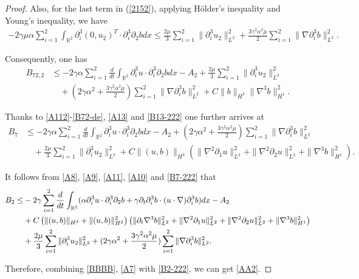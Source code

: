 \documentclass[reqno,11pt]{amsart}
\def\R{\mathbb R}
\numberwithin{Thm}{section}
\begin{document}
\begin{proof}
Also, for the last term in (\ref{2152}), applying H\"{o}lder's inequality and Young's inequality, we have
 \begin{align*}
-2\gamma\mu\alpha\sum_{i=1}^2\int_{\R^2}\partial_i^3 (0,u_2)^{T}\cdot\partial_i^3\partial_2 bdx
\leq \frac{2\mu}{3}\sum_{i=1}^2\| \partial_i^3u_2\|_{L^2}^2+\frac{3\gamma^2\alpha^2\mu}{2}\sum_{i=1}^2\|\nabla \partial_i^3b\|_{L^2}^2.
\end{align*}

Consequently, one has
\begin{align}\label{B13-222}
B_{72,2}
&\leq-2\gamma\alpha\sum_{i=1}^2\frac{d}{dt}\int_{\R^2}\partial_i^3u\cdot\partial_i^3 \partial_2bdx-A_2+ \frac{2\mu}{3}\sum_{i=1}^2\| \partial_i^3u_2\|_{L^2}^2\nonumber\\
&\quad+(2\gamma\alpha^2+\frac{3\gamma^2\alpha^2\mu}{2})\sum_{i=1}^2\|\nabla \partial_i^3b\|_{L^2}^2+C\|b\|_{H^{3}}\|\nabla^3 b\|_{H^1}^2.
\end{align}






Thanks to \eqref{A112}-\eqref{B72-de}, \eqref{A13} and \eqref{B13-222} one further arrives at
\begin{align}\label{B7-222}
B_{7}
&\leq-2\gamma\alpha\sum_{i=1}^2\frac{d}{dt}\int_{\R^2}\partial_i^3u\cdot\partial_i^3 \partial_2bdx-A_2+(2\gamma\alpha^2+\frac{3\gamma^2\alpha^2\mu}{2})\sum_{i=1}^2\|\nabla\partial_i^3 b\|_{L^2}^2\nonumber\\
&\quad+ \frac{2\mu}{3}\sum_{i=1}^2\| \partial_i^3u_2\|_{L^2}^2+C\| (u,b)\|_{H^{3}}(\|\nabla^2\partial_1u\|_{L^2}^2+\|\nabla^2\partial_2u\|_{L^2}^2+\|\nabla^3 b\|_{H^1}^2).
\end{align}



It follows from \eqref{A8}, \eqref{A9}, \eqref{A11}, \eqref{A10} and \eqref{B7-222}  that
\begin{align}\label{B2-222}
B_2
\leq&
-2\gamma\sum_{i=1}^2\frac{d}{dt}\int_{\R^2}(\alpha\partial_i^3u\cdot\partial_i^3\partial_2b+\gamma\partial_{t}\partial_i^3b\cdot (u\cdot\nabla)\partial_i^3 b)dx-{A_{2}}\notag\\
&+C\left(\|(u,b)\|_{H^{3}}+\|(u,b)\|_{H^{3}}^2\right)\left(\|\partial_t\nabla^3b\|_{L^2}^2+\|\nabla^2\partial_1u\|_{L^2}^2+\|\nabla^2\partial_2u\|_{L^2}^2+\|\nabla^3 b\|_{H^1}^2\right)\notag\\
&+\frac{2\mu}{3}\sum_{i=1}^2\| \partial_i^3u_2\|_{L^2}^2+(2\gamma\alpha^2+\frac{3\gamma^2\alpha^2\mu}{2})\sum_{i=1}^2\|\nabla\partial_i^3 b\|_{L^2}^2.
\end{align}




Therefore, combining \eqref{BBBB}, \eqref{A7} with \eqref{B2-222}, we can get \eqref{AA2}.
\end{proof}
\end{document}
